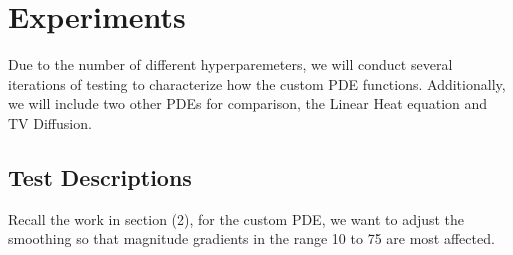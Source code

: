 \documentclass{article}
\begin{document}
  \newpage
  \section{Experiments}
  Due to the number of different hyperparemeters, we will conduct
  several iterations of testing to characterize how the custom PDE functions.
  Additionally, we will include two other PDEs for comparison,
  the Linear Heat equation and TV Diffusion.

  \subsection{Test Descriptions}
  Recall the work in section (2), for the custom PDE, we want to adjust
  the smoothing so that magnitude gradients in the range 10 to 75 are most affected.
\end{document}
